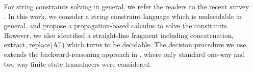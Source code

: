 
For string constraints solving in general, we refer the readers to the recent survey \cite{Ama20}. In this work, we consider a string constraint language which is undecidable in general, and propose a propagation-based calculus to solve the constraints. However, we also identified a straight-line fragment including concatenation, extract, replace(All) which turns to be decidable. The decision procedure we use extends the backward-reasoning approach in \cite{CHL+19}, where only standard one-way and two-way finite-state transducers were considered. 
